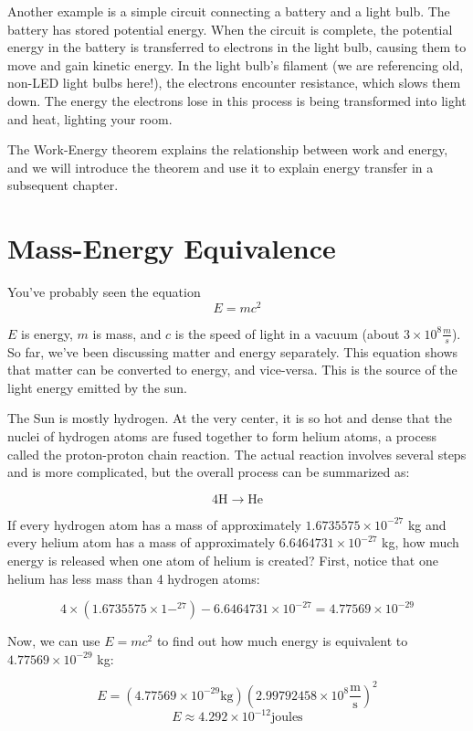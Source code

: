 Another example is a simple circuit connecting a battery and a light bulb. The 
battery has stored potential energy. When the circuit is complete, the potential 
energy in the battery is transferred to electrons in the light bulb, causing them 
to move and gain kinetic energy. In the light bulb's filament (we are referencing 
old, non-LED light bulbs here!), the electrons encounter resistance, which slows 
them down. The energy the electrons lose in this process is being transformed into 
light and heat, lighting your room. 

The Work-Energy theorem explains the relationship between work and energy, and we 
will introduce the theorem and use it to explain energy transfer in a subsequent 
chapter. 

\section{Mass-Energy Equivalence}
You've probably seen the equation
$$E = mc^2$$

$E$ is energy, $m$ is mass, and $c$ is the speed of light in a vacuum (about $3 
\times 10^8 \frac{m}{s}$). So far, we've been discussing matter and energy 
separately. This equation shows that matter can be converted to energy, and 
vice-versa. This is the source of the light energy emitted by the sun. 

The Sun is mostly hydrogen. At the very center, it is so hot and dense that the 
nuclei of hydrogen atoms are fused together to form helium atoms, a process 
called the proton-proton chain reaction. The actual reaction involves several 
steps and is more complicated, but the overall process can be summarized as:

$$4\text{H} \to \text{He}$$

If every hydrogen atom has a mass of approximately $1.6735575 \times 10^{-27}$ kg 
and every helium atom has a mass of approximately $6.6464731 \times 10^{-27}$ kg, 
how much energy is released when one atom of helium is created? First, notice 
that one helium has less mass than 4 hydrogen atoms:

$$4 \times \left( 1.6735575 \times 1-^{27} \right) - 6.6464731 \times 10^{-27} = 
4.77569 \times 10^{-29}$$

Now, we can use $E = mc^2$ to find out how much energy is equivalent to $4.77569 
\times 10^{-29}$ kg:

$$E = \left( 4.77569 \times 10^{-29} \text{kg} \right) \left( 2.99792458 \times 
10^8 \frac{\text{m}}{\text{s}} \right)^2$$
$$E \approx 4.292 \times 10^{-12} \text{joules}$$

